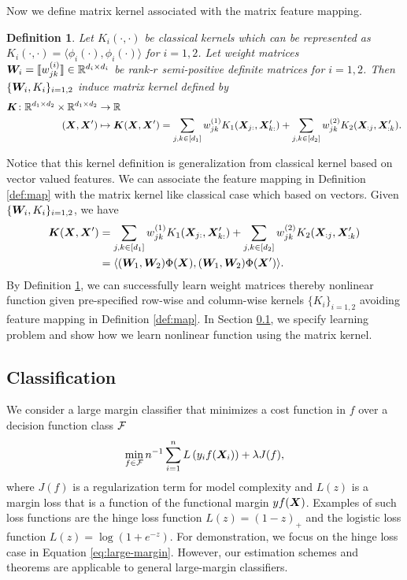 \documentclass[12pt]{article}
\newtheorem{defn}{Definition}
\begin{document}
   Now we define matrix kernel associated with the matrix feature mapping.
\begin{defn}\label{def:kernel}
Let $K_i(\cdot,\cdot)$ be classical kernels which can be represented as $K_i(\cdot,\cdot) = \langle \phi_i(\cdot),\phi_i(\cdot)\rangle$ for $i=1,2$. Let weight matrices $\bm{W}_i = \llbracket w^{(i)}_{jk} \rrbracket\in\mathbb{R}^{d_i\times d_i}$ be  rank-$r$ semi-positive definite matrices for $i = 1,2$. Then $\{\bm{W}_i,K_i\}_{i=1,2}$  induce matrix kernel defined by
\begin{align}
    \bm K\colon\mathbb{R}^{d_1\times d_2}\times \mathbb{R}^{d_1\times d_2}&\rightarrow \mathbb{R}\\
    (\bm X,\bm X')&\mapsto \bm K(\bm X,\bm X')  = \sum_{j,k\in[d_1]}w^{(1)}_{jk}K_1(\bm X_{j:},\bm X'_{k:})+\sum_{j,k\in[d_2]}w^{(2)}_{jk}K_2(\bm X_{:j},\bm X'_{:k}).
\end{align}
\end{defn}
Notice that this kernel definition is generalization from classical kernel based on vector valued features. We can associate the feature mapping in Definition \ref{def:map} with the matrix kernel like classical case which based on vectors. Given $\{\bm{W}_i,K_i\}_{i=1,2}$, we have
\begin{align}\bm K(\bm X,\bm X')& = \sum_{j,k\in[d_1]}w^{(1)}_{jk}K_1(\bm X_{j:},\bm X'_{k:})+\sum_{j,k\in[d_2]}w^{(2)}_{jk}K_2(\bm X_{:j},\bm X'_{:k}) \\
&=\langle (\bm{W}_1,\bm{W}_2)\Phi(\bm X),(\bm{W}_1,\bm{W}_2)\Phi(\bm X')\rangle.
\end{align}
By Definition \ref{def:kernel}, we can successfully learn weight matrices thereby nonlinear function given pre-specified row-wise and column-wise kernels $\{K_i\}_{i=1,2}$ avoiding feature mapping in Definition \ref{def:map}. In Section \ref{subsec:pb1}, we specify learning problem and show how we learn nonlinear function using the matrix kernel.



\subsection{Classification}
\label{subsec:pb1}

We consider a large margin classifier that minimizes a cost function in $f$ over a decision function class $\mathcal{F}$
\begin{align}
\label{eq:large-margin}
\min_{f\in\mathcal{F}}n^{-1}\sum_{i=1}^n L\left(y_i f(\bm X_i)\right)+\lambda J(f),
\end{align}
where $J(f)$ is a regularization term for model complexity and $L(z)$ is a margin loss that is a function of the functional margin $yf(\bm X)$. Examples of such loss functions are the hinge loss function $L(z) = (1-z)_+$ and the logistic loss function $L(z) =\log(1+e^{-z})$.  For demonstration, we focus on the hinge loss case in Equation \eqref{eq:large-margin}. However, our estimation schemes and theorems are applicable to general large-margin classifiers.
\end{document}
